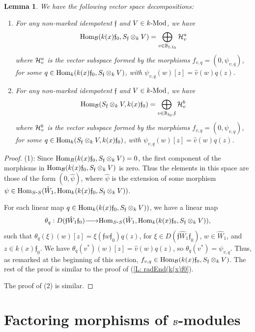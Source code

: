 \documentclass{article}
\newtheorem{lemma}[theorem]{Lemma}
\theoremstyle{definition}
\newcommand{\Hom}{{ \rm Hom }}
\newcommand{\Mod}{{ \rm Mod }}
\renewcommand{\frak}{\mathfrak}
\newcommand{\g}{\hbox{-}}
\newcommand{\hueca}[1]{\mathbb{#1}}
\newcommand{\rightmap}[1]{\smash{\mathop{\hbox to 
20pt{\rightarrowfill}}\limits^{#1}}}
\begin{document}
\begin{lemma}\label{L: decompos of HomB(gen,sumadesimples}
We have the following vector space decompositions:
\begin{enumerate}
\item For any non-marked idempotent $\frak{f}$ and $V\in k\g\Mod$, we have 
$$\Hom_{\cal B}
(k(x)\frak{f}_0,S_{\frak{f}}\otimes_kV)
=
\bigoplus_{v\in \hueca{B}_{\frak{f},\frak{f}_0}}{\cal H}_v^a$$
where ${\cal H}^a_v$ is the vector subspace formed by the morphisms $f_{v,q}=(0,\psi_{v,q})$, for some $q\in \Hom_k(k(x)\frak{f}_0,S_{\frak{f}}\otimes_kV)$, with $\psi_{v,q}(w)[z]=\hat{v}(w)q(z)$. 
\item For any non-marked idempotent $\frak{f}$ and $V\in k\g\Mod$, we have 
$$\Hom_{\cal B}
(S_{\frak{f}}\otimes_kV,k(x)\frak{f}_0)
=
\bigoplus_{v\in \hueca{B}_{\frak{f}_0},\frak{f}}{\cal H}_v^b$$
where ${\cal H}^b_v$ is the vector subspace formed by the morphisms $f_{v,q}=(0,\psi_{v,q})$, for some $q\in \Hom_k(S_{\frak{f}}\otimes_kV,k(x)\frak{f}_0)$, with $\psi_{v,q}(w)[z]=\hat{v}(w)q(z)$. 
\end{enumerate}
\end{lemma}

\begin{proof} (1): Since $\Hom_R(k(x)\frak{f}_0,S_{\frak{f}}\otimes_kV)=0$, the first component of the morphisms in $\Hom_{\cal B}
(k(x)\frak{f}_0,S_{\frak{f}}\otimes_kV)$ is zero. 
 Thus the elements in this space are those of the form $(0,\hat{\psi})$, where $\hat{\psi}$ is the extension of some morphism $\psi\in \Hom_{S\g S}(\hat{W}_1,\Hom_k(k(x)\frak{f}_0,S_{\frak{f}}\otimes_kV))$.  

For each linear map $q\in \Hom_k(k(x)\frak{f}_0,S_{\frak{f}}\otimes_kV))$, we have a linear map 
$$\theta_q:D(\frak{f}\hat{W}_1\frak{f}_0)\rightmap{}\Hom_{S\g S}(\hat{W}_1,\Hom_k(k(x)\frak{f}_0,S_{\frak{f}}\otimes_kV)),$$
  such that $\theta_q(\xi)(w)[z]=\xi(\frak{f}w\frak{f}_0)q(z)$, for $\xi\in D(\frak{f}\hat{W}_1\frak{f}_0)$, $w\in \hat{W}_1$, and $z\in k(x)\frak{f}_0$. 
  We have $\theta_q(v^*)(w)[z]=\hat{v}(w)q(z)$, so $\theta_q(v^*)=\psi_{v,q}$. 
Thus, as remarked at the beginning of this section,  $f_{v,q}\in \Hom_{\cal B}(k(x)\frak{f}_0,S_{\frak{f}}\otimes_kV)$. The rest of the proof is similar to the proof of (\ref{L: radEnd(k(x)f0}). 

The proof of (2) is similar. 
\end{proof}

\section{Factoring morphisms of ${\cal B}$-modules}
\end{document}
